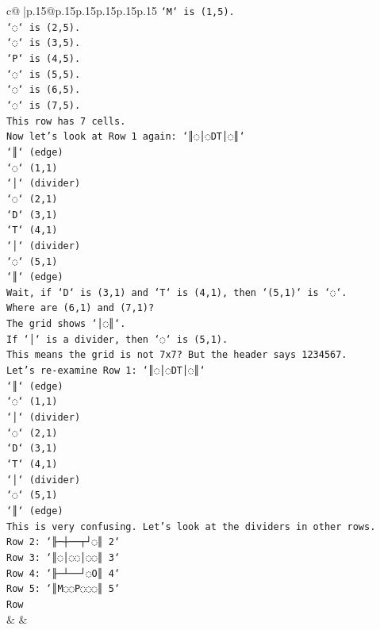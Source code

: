 \documentclass{article}
\begin{document}
{\begin{supertabular}{c@{$\;$}|p{.15\linewidth}@{}p{.15\linewidth}p{.15\linewidth}p{.15\linewidth}p{.15\linewidth}p{.15\linewidth}}
{{{\texttt{`M` is (1,5).} \\
\texttt{`◌` is (2,5).} \\
\texttt{`◌` is (3,5).} \\
\texttt{`P` is (4,5).} \\
\texttt{`◌` is (5,5).} \\
\texttt{`◌` is (6,5).} \\
\texttt{`◌` is (7,5).} \\
\texttt{This row has 7 cells.} \\
\texttt{Now let's look at Row 1 again: `║◌│◌DT│◌║`} \\
\texttt{`║` (edge)} \\
\texttt{`◌` (1,1)} \\
\texttt{`│` (divider)} \\
\texttt{`◌` (2,1)} \\
\texttt{`D` (3,1)} \\
\texttt{`T` (4,1)} \\
\texttt{`│` (divider)} \\
\texttt{`◌` (5,1)} \\
\texttt{`║` (edge)} \\
\texttt{Wait, if `D` is (3,1) and `T` is (4,1), then `(5,1)` is `◌`.} \\
\texttt{Where are (6,1) and (7,1)?} \\
\texttt{The grid shows `│◌║`.} \\
\texttt{If `│` is a divider, then `◌` is (5,1).} \\
\texttt{This means the grid is not 7x7? But the header says 1234567.} \\
\texttt{Let's re{-}examine Row 1: `║◌│◌DT│◌║`} \\
\texttt{`║` (edge)} \\
\texttt{`◌` (1,1)} \\
\texttt{`│` (divider)} \\
\texttt{`◌` (2,1)} \\
\texttt{`D` (3,1)} \\
\texttt{`T` (4,1)} \\
\texttt{`│` (divider)} \\
\texttt{`◌` (5,1)} \\
\texttt{`║` (edge)} \\
\texttt{This is very confusing. Let's look at the dividers in other rows.} \\
\texttt{Row 2: `╟─┼──┬┘◌║ 2`} \\
\texttt{Row 3: `║◌│◌◌│◌◌║ 3`} \\
\texttt{Row 4: `╟─┴──┘◌O║ 4`} \\
\texttt{Row 5: `║M◌◌P◌◌◌║ 5`} \\
\texttt{Row} \\
            }
        }
    }
    & & \\ \\


\end{supertabular}}
\end{document}
